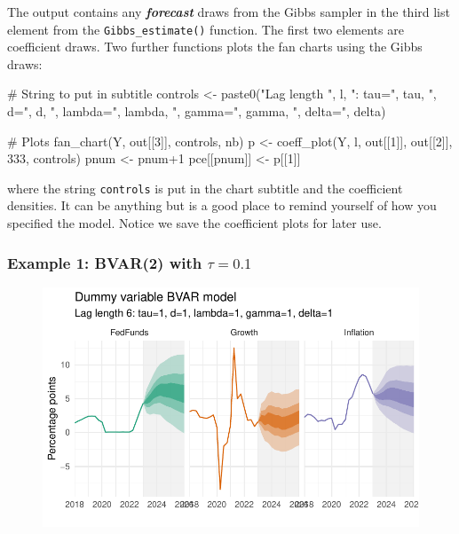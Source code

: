 \documentclass[
  letterpaper,
]{book}
\newenvironment{Shaded}{\begin{snugshade}}{\end{snugshade}}
\newcommand{\CommentTok}[1]{\textcolor[rgb]{0.37,0.37,0.37}{#1}}
\newcommand{\DecValTok}[1]{\textcolor[rgb]{0.68,0.00,0.00}{#1}}
\newcommand{\FunctionTok}[1]{\textcolor[rgb]{0.28,0.35,0.67}{#1}}
\newcommand{\NormalTok}[1]{\textcolor[rgb]{0.00,0.23,0.31}{#1}}
\newcommand{\OtherTok}[1]{\textcolor[rgb]{0.00,0.23,0.31}{#1}}
\newcommand{\SpecialCharTok}[1]{\textcolor[rgb]{0.37,0.37,0.37}{#1}}
\newcommand{\StringTok}[1]{\textcolor[rgb]{0.13,0.47,0.30}{#1}}
\begin{document}
The output contains any \textbf{\emph{forecast}} draws from the Gibbs
sampler in the third list element from the \texttt{Gibbs\_estimate()}
function. The first two elements are coefficient draws. Two further
functions plots the fan charts using the Gibbs draws:

\begin{Shaded}
\begin{Highlighting}[]
\CommentTok{\# String to put in subtitle}
\NormalTok{controls }\OtherTok{\textless{}{-}} \FunctionTok{paste0}\NormalTok{(}\StringTok{"Lag length "}\NormalTok{, l, }\StringTok{": tau="}\NormalTok{, tau, }\StringTok{", d="}\NormalTok{, d,}
                   \StringTok{", lambda="}\NormalTok{, lambda, }\StringTok{", gamma="}\NormalTok{, gamma, }\StringTok{", delta="}\NormalTok{, delta)}

\CommentTok{\# Plots}
\FunctionTok{fan\_chart}\NormalTok{(Y, out[[}\DecValTok{3}\NormalTok{]], controls, nb)}
\NormalTok{p           }\OtherTok{\textless{}{-}} \FunctionTok{coeff\_plot}\NormalTok{(Y, l, out[[}\DecValTok{1}\NormalTok{]], out[[}\DecValTok{2}\NormalTok{]], }\DecValTok{333}\NormalTok{, controls)}
\NormalTok{pnum        }\OtherTok{\textless{}{-}}\NormalTok{ pnum}\SpecialCharTok{+}\DecValTok{1}
\NormalTok{pce[[pnum]] }\OtherTok{\textless{}{-}}\NormalTok{ p[[}\DecValTok{1}\NormalTok{]]}
\end{Highlighting}
\end{Shaded}

where the string \texttt{controls} is put in the chart subtitle and the
coefficient densities. It can be anything but is a good place to remind
yourself of how you specified the model. Notice we save the coefficient
plots for later use.

\hypertarget{example-1-bvar2-with-tau0.1}{%
\subsubsection{\texorpdfstring{Example 1: BVAR(2) with
\(\tau=0.1\)}{Example 1: BVAR(2) with \textbackslash tau=0.1}}\label{example-1-bvar2-with-tau0.1}}

\begin{figure}

{\centering \includegraphics{BVAR_files/figure-pdf/estim-1.pdf}

}

\end{figure}
\end{document}

